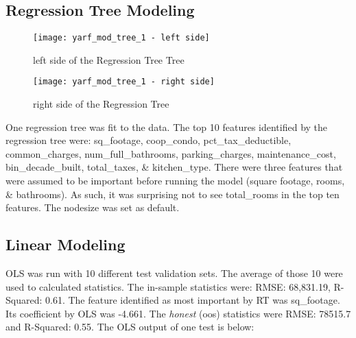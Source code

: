 \documentclass{article}
\begin{document}
\subsection{Regression Tree Modeling}

\begin{figure}[htb]
    \centering
    \texttt{[image: yarf\_mod\_tree\_1 - left side]}
    \caption{left side of the Regression Tree Tree}
    \label{fig:enter-labe}
\end{figure}

\begin{figure}[htb]
    \centering
    \texttt{[image: yarf\_mod\_tree\_1 - right side]}
    \caption{right side of the Regression Tree}
    \label{fig:enter-label}
\end{figure}

One regression tree was fit to the data. The top 10 features identified by the regression tree were: sq\_footage, coop\_condo, pct\_tax\_deductible, common\_charges, num\_full\_bathrooms, parking\_charges, maintenance\_cost, bin\_decade\_built, total\_taxes, \& kitchen\_type. There were three features that were assumed to be important before running the model (square footage, rooms, \& bathrooms). As such, it was surprising not to see total\_rooms in the top ten features. The nodesize was set as default. 

\subsection{Linear Modeling}

OLS was run with 10 different test validation sets. The average of those 10 were used to calculated statistics. The in-sample statistics were: RMSE: 68,831.19, R-Squared: 0.61. The feature identified as most important by RT was sq\_footage. Its coefficient by OLS was -4.661. The \emph{honest} (oos) statistics were RMSE: 78515.7 and R-Squared: 0.55. The OLS output of one test is below:
\end{document}
